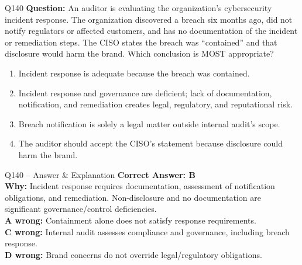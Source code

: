 \documentclass[aspectratio=169,10pt]{beamer}
\begin{document}
	\begin{frame}[t]{Q140}
		\small
		\textbf{Question:} An auditor is evaluating the organization's cybersecurity incident response. The organization discovered a breach six months ago, did not notify regulators or affected customers, and has no documentation of the incident or remediation steps. The CISO states the breach was ``contained'' and that disclosure would harm the brand. Which conclusion is MOST appropriate?
		\begin{enumerate}[label=\Alph*.,itemsep=1pt,topsep=2pt]
			\item Incident response is adequate because the breach was contained.
			\item Incident response and governance are deficient; lack of documentation, notification, and remediation creates legal, regulatory, and reputational risk.
			\item Breach notification is solely a legal matter outside internal audit's scope.
			\item The auditor should accept the CISO's statement because disclosure could harm the brand.
		\end{enumerate}
	\end{frame}
	
	\begin{frame}[t]{Q140 -- Answer \& Explanation}
		\small
		\textbf{Correct Answer: B} \\[4pt]
		\textbf{Why:} Incident response requires documentation, assessment of notification obligations, and remediation. Non-disclosure and no documentation are significant governance/control deficiencies. \\[4pt]
		\textbf{A wrong:} Containment alone does not satisfy response requirements. \\[2pt]
		\textbf{C wrong:} Internal audit assesses compliance and governance, including breach response. \\[2pt]
		\textbf{D wrong:} Brand concerns do not override legal/regulatory obligations.
	\end{frame}
	
\end{document}
